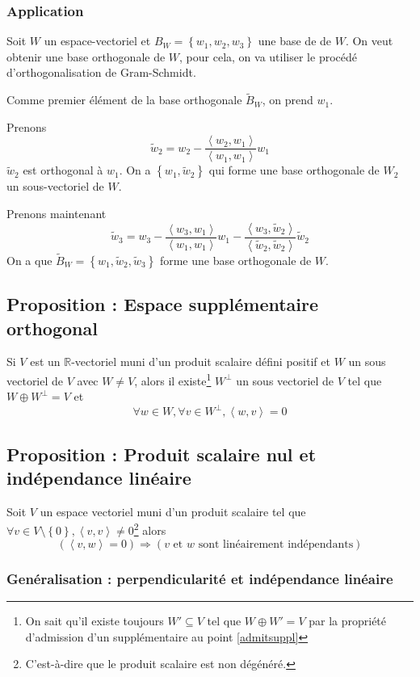\documentclass[a4paper,10pt]{article}
\newcommand{\mt}[1]{\widetilde{ #1 }} %
\newcommand{\grp}[1]{\left\langle #1 \right\rangle} %
\newcommand{\set}[1]{\left\lbrace #1 \right\rbrace } %
\newcommand{\so}{\Rightarrow} %
\newcommand{\RR}{\mathbb{R}} %
\begin{document}
   \subsubsection{Application}
    Soit $W$ un espace-vectoriel et $B_W=\set{w_1, w_2, w_3}$ une base de de $W$. On veut obtenir une base orthogonale de $W$, pour cela, on va utiliser le procédé d'orthogonalisation de Gram-Schmidt.

    Comme premier élément de la base orthogonale $\mt{B}_W$, on prend $w_1$.

    Prenons
     $$\mt{w}_2=w_2-\frac{\grp{w_2,w_1}}{\grp{w_1,w_1}}w_1$$
    $\mt{w}_2$ est orthogonal à $w_1$. On a $\set{w_1,\mt{w}_2}$ qui forme une base orthogonale de $W_2$ un sous-vectoriel de $W$.

    Prenons maintenant
     $$\mt{w}_3=w_3-\frac{\grp{w_3,w_1}}{\grp{w_1,w_1}}w_1-\frac{\grp{w_3,\mt{w}_2}}{\grp{\mt{w}_2,\mt{w}_2}}\mt{w}_2$$
    On a que $\mt{B}_W=\set{w_1,\mt{w}_2, \mt{w}_3}$ forme une base orthogonale de $W$.

  \subsection{Proposition : Espace supplémentaire orthogonal}%
   Si $V$ est un $\RR$-vectoriel muni d'un produit scalaire défini positif et $W$ un sous vectoriel de $V$ avec $W\neq V$, alors il existe\footnote{On sait qu'il existe toujours $W'\subseteq V$ tel que $W \oplus W'=V$ par la propriété d'admission d'un supplémentaire au point \ref{admitsuppl}} $W^\perp$ un sous vectoriel de $V$ tel que $W \oplus W^\perp = V$ et
    $$\forall w \in W,\forall v\in W^\perp, \grp{w,v}=0$$

  \subsection{Proposition : Produit scalaire nul et indépendance linéaire}%
   Soit $V$ un espace vectoriel muni d'un produit scalaire tel que $\forall v \in V\setminus\set{0}, \grp{v,v}\neq 0$\footnote{C'est-à-dire que le produit scalaire est non dégénéré.} alors $$(\grp{v,w}=0) \so (v \text{ et } w \text{ sont linéairement indépendants})$$

   \subsubsection{Genéralisation : perpendicularité et indépendance linéaire}%
\end{document}
